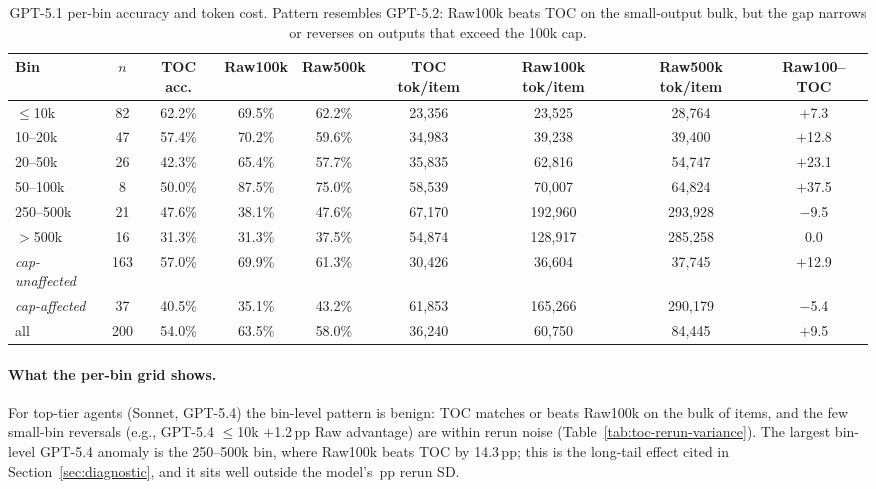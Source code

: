 \documentclass{article}
\begin{document}
\begin{table}[h]
\centering
\scriptsize
\setlength{\tabcolsep}{4pt}
\caption{GPT-5.1 per-bin accuracy and token cost. Pattern resembles GPT-5.2: Raw100k beats TOC on the small-output bulk, but the gap narrows or reverses on outputs that exceed the 100k cap.}
\label{tab:appendix-bin-gpt51}
\begin{tabular}{lcccccccc}
\toprule
Bin & $n$ & TOC acc. & Raw100k & Raw500k & TOC tok/item & Raw100k tok/item & Raw500k tok/item & Raw100--TOC \\
\midrule
$\le$10k & 82 & 62.2\% & 69.5\% & 62.2\% & 23{,}356 & 23{,}525 & 28{,}764 & $+$7.3 \\
10--20k & 47 & 57.4\% & 70.2\% & 59.6\% & 34{,}983 & 39{,}238 & 39{,}400 & $+$12.8 \\
20--50k & 26 & 42.3\% & 65.4\% & 57.7\% & 35{,}835 & 62{,}816 & 54{,}747 & $+$23.1 \\
50--100k & 8 & 50.0\% & 87.5\% & 75.0\% & 58{,}539 & 70{,}007 & 64{,}824 & $+$37.5 \\
250--500k & 21 & 47.6\% & 38.1\% & 47.6\% & 67{,}170 & 192{,}960 & 293{,}928 & $-$9.5 \\
$>$500k & 16 & 31.3\% & 31.3\% & 37.5\% & 54{,}874 & 128{,}917 & 285{,}258 & 0.0 \\
\midrule
\textit{cap-unaffected} & 163 & 57.0\% & 69.9\% & 61.3\% & 30{,}426 & 36{,}604 & 37{,}745 & $+$12.9 \\
\textit{cap-affected} & 37 & 40.5\% & 35.1\% & 43.2\% & 61{,}853 & 165{,}266 & 290{,}179 & $-$5.4 \\
all & 200 & 54.0\% & 63.5\% & 58.0\% & 36{,}240 & 60{,}750 & 84{,}445 & $+$9.5 \\
\bottomrule
\end{tabular}
\end{table}

\paragraph{What the per-bin grid shows.}
For top-tier agents (Sonnet, GPT-5.4) the bin-level pattern is benign: TOC matches or beats Raw100k on the bulk of items, and the few small-bin reversals (e.g., GPT-5.4 ${\le}$10k $+$1.2\,pp Raw advantage) are within rerun noise (Table~\ref{tab:toc-rerun-variance}). The largest bin-level GPT-5.4 anomaly is the 250--500k bin, where Raw100k beats TOC by 14.3\,pp; this is the long-tail effect cited in Section~\ref{sec:diagnostic}, and it sits well outside the model's \GPTFiveFourTOCRerunSD\,pp rerun SD.
\end{document}
